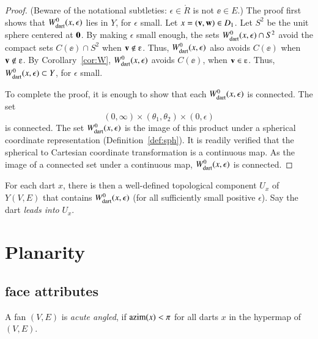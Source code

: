 \begin{proof}  (Beware of the notational subtleties: $\epsilon\in\ring{R}$ is not $\ee\in E$.)  The proof first shows that $W^0_{\text{dart}}(x,\epsilon)$ lies in $Y$,
for $\epsilon$ small.  Let $x=({\mathbf v},{\mathbf w})\in D_1$.  
Let $S^2$ be the unit sphere centered at ${\mathbf 0}$.
By making $\epsilon$ small enough,
the sets $W^0_{\text{dart}}(x,\epsilon)\cap S^2$
avoid the compact sets $C(\ee)\cap S^2$ when $\v\not\in \ee$.
Thus, $W^0_{\text{dart}}(x,\epsilon)$ also avoids $C(\ee)$ when $\v\not\in \ee$.
By Corollary~\ref{cor:W}, $W^0_{\text{dart}}(x,\epsilon)$ avoids $C(\ee)$, when $\v\in \ee$.
Thus, $W^0_{\text{dart}}(x,\epsilon)\subset Y$, for $\epsilon$ small.

To complete the proof, it is enough to show that each $W^0_{\text{dart}}(x,\epsilon)$ is
connected.  
The  set
   $$
    (0,\infty) \times (\theta_1,\theta_2) \times (0,\epsilon)
   $$
is connected.
The set $W^0_{\text{dart}}(x,\epsilon)$  is the image of this product
under a spherical coordinate representation (Definition~\ref{def:sph}).
%
It is readily verified that the spherical to Cartesian coordinate transformation is
a continuous map. As the image of a connected set under a continuous map, $W^0_{\text{dart}}(x,\epsilon)$ is connected.
\end{proof}
%
%

\begin{definition} For each dart $x$, 
there is then a well-defined topological
component $U_x$ of $Y(V,E)$ 
that contains $W^0_{\text{dart}}(x,\epsilon)$ (for all
sufficiently small positive $\epsilon$). Say the dart {\it leads into}
$U_x$.
\end{definition}
%


\section{Planarity}


\subsection{face attributes}

\begin{definition}
A fan $(V,E)$ is {\it acute angled}, if ${\operatorname{azim}}(x)<\pi$ for all darts $x$ in the
hypermap of $(V,E)$.
\end{definition}
%

